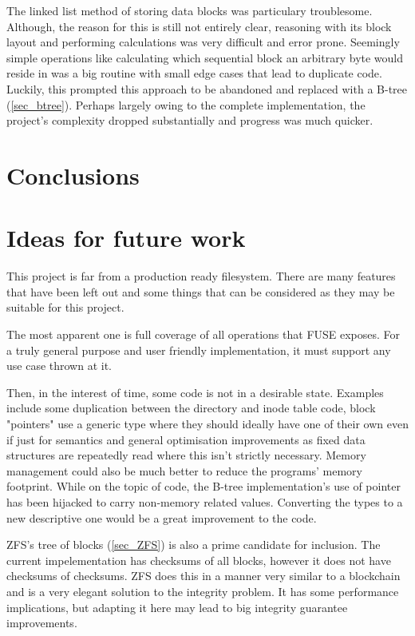         The linked list method of storing data blocks was particulary
        troublesome. Although, the reason for this is still not entirely clear,
        reasoning with its block layout and performing calculations was very
        difficult and error prone. Seemingly simple operations like calculating
        which sequential block an arbitrary byte would reside in was a big
        routine with small edge cases that lead to duplicate code. Luckily,
        this prompted this approach to be abandoned and replaced with a B-tree
        (\ref{sec_btree}). Perhaps largely owing to the complete
        implementation, the project's complexity dropped substantially and
        progress was much quicker.

    \section{Conclusions}

    \section{Ideas for future work}

        This project is far from a production ready filesystem. There are many
        features that have been left out and some things that can be considered
        as they may be suitable for this project.

        The most apparent one is full coverage of all operations that FUSE
        exposes. For a truly general purpose and user friendly implementation,
        it must support any use case thrown at it.

        Then, in the interest of time, some code is not in a desirable state.
        Examples include some duplication between the directory and inode table
        code, block "pointers" use a generic type where they should ideally
        have one of their own even if just for semantics and general
        optimisation improvements as fixed data structures are repeatedly read
        where this isn't strictly necessary. Memory management could also be
        much better to reduce the programs' memory footprint. While on the
        topic of code, the B-tree implementation's use of pointer has been
        hijacked to carry non-memory related values. Converting the types to a
        new descriptive one would be a great improvement to the code.

        ZFS's tree of blocks (\ref{sec_ZFS}) is also a prime candidate for
        inclusion. The current impelementation has checksums of all blocks,
        however it does not have checksums of checksums. ZFS does this in a
        manner very similar to a blockchain and is a very elegant solution to
        the integrity problem. It has some performance implications, but
        adapting it here may lead to big integrity guarantee improvements.

